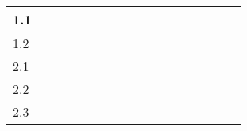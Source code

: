\begin{table}[H]
{\begin{tabular}{|l|l|l|l|l|l|l|l|l|l|l|l|l|l|l|l|l|}
1.1       & \cellcolor[HTML]{000000} &                                                 &                          &                          &                          &                          &                          &                          &                                                 &                                                 &                                                 &                          &                          &                          &                          &                          \\ \hline
1.2       & \cellcolor[HTML]{000000} &                                                 &                          &                          &                          &                          &                          &                          &                                                 &                                                 &                                                 &                          &                          &                          &                          &                          \\ \hline
2.1       &                          & \cellcolor[HTML]{000000}{\color[HTML]{000000} } &                          &                          &                          &                          &                          &                          &                                                 &                                                 &                                                 &                          &                          &                          &                          &                          \\ \hline
2.2       &                          & \cellcolor[HTML]{000000}                        &                          &                          &                          &                          &                          &                          &                                                 &                                                 &                                                 &                          &                          &                          &                          &                          \\ \hline
2.3       &                          & \cellcolor[HTML]{000000}                        &                          &                          &                          &                          &                          &                          &                                                 &                                                 &                                                 &                          &                          &                          &                          &                          \\ \hline

\end{tabular}}
\end{table}
